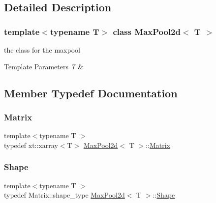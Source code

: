 \subsection{Detailed Description}
\subsubsection*{template$<$typename T$>$\newline
class Max\+Pool2d$<$ T $>$}

the class for the maxpool 


\begin{DoxyTemplParams}{Template Parameters}
{\em T} & \\
\hline
\end{DoxyTemplParams}


\subsection{Member Typedef Documentation}
\mbox{\label{class_max_pool2d_a8e701daf0dfb0e61e36eec865297a4e9}} 
\subsubsection{\texorpdfstring{Matrix}{Matrix}}
{\footnotesize\ttfamily template$<$typename T $>$ \\
typedef xt\+::xarray$<$T$>$ \mbox{\hyperlink{class_max_pool2d}{Max\+Pool2d}}$<$ T $>$\+::\mbox{\hyperlink{class_layer_a22b1e7286096aa62bd245536c8ebdaf1}{Matrix}}}

\mbox{\label{class_max_pool2d_ad70f776b32f3a19af78573b634d00072}} 
\subsubsection{\texorpdfstring{Shape}{Shape}}
{\footnotesize\ttfamily template$<$typename T $>$ \\
typedef Matrix\+::shape\+\_\+type \mbox{\hyperlink{class_max_pool2d}{Max\+Pool2d}}$<$ T $>$\+::\mbox{\hyperlink{class_layer_a8313f42d2292d12dd5d40cc115636693}{Shape}}}



